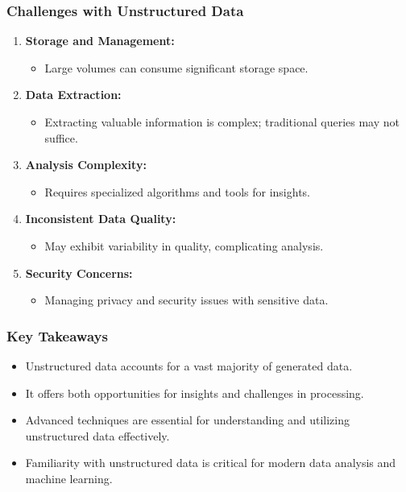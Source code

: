 \documentclass[aspectratio=169]{beamer}
\begin{document}
\begin{frame}[fragile]
    \frametitle{Challenges with Unstructured Data}
    \begin{enumerate}
        \item \textbf{Storage and Management:} 
        \begin{itemize}
            \item Large volumes can consume significant storage space.
        \end{itemize}
        
        \item \textbf{Data Extraction:}
        \begin{itemize}
            \item Extracting valuable information is complex; traditional queries may not suffice.
        \end{itemize}
        
        \item \textbf{Analysis Complexity:}
        \begin{itemize}
            \item Requires specialized algorithms and tools for insights.
        \end{itemize}
        
        \item \textbf{Inconsistent Data Quality:}
        \begin{itemize}
            \item May exhibit variability in quality, complicating analysis.
        \end{itemize}
        
        \item \textbf{Security Concerns:}
        \begin{itemize}
            \item Managing privacy and security issues with sensitive data.
        \end{itemize}
    \end{enumerate}
\end{frame}

\begin{frame}[fragile]
    \frametitle{Key Takeaways}
    \begin{itemize}
        \item Unstructured data accounts for a vast majority of generated data.
        \item It offers both opportunities for insights and challenges in processing.
        \item Advanced techniques are essential for understanding and utilizing unstructured data effectively.
        \item Familiarity with unstructured data is critical for modern data analysis and machine learning.
    \end{itemize}
\end{frame}
\end{document}
